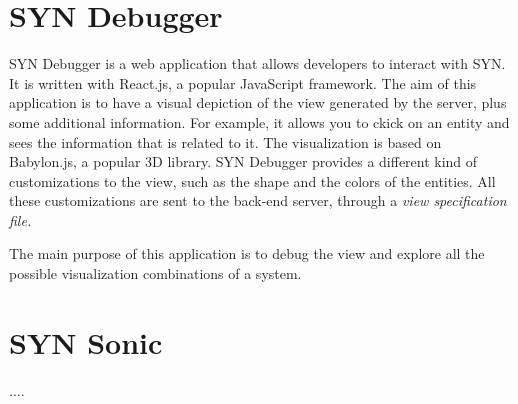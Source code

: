 \section{SYN Debugger}

SYN Debugger is a web application that allows developers to interact with SYN. It is written with React.js, a popular JavaScript framework. 
The aim of this application is to have a visual depiction of the view generated by the server, plus some additional information. 
For example, it allows you to ckick on an entity and sees the information that is related to it. 
The visualization is based on Babylon.js, a popular 3D library. 
SYN Debugger provides a different kind of customizations to the view, such as the shape and the colors of the entities. 
All these customizations are sent to the back-end server, through a \it{view specification} file. 

The main purpose of this application is to debug the view and explore all the possible visualization combinations of a system. 

\section{SYN Sonic}

....
